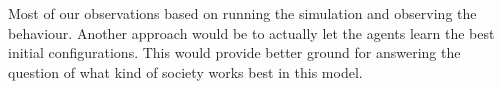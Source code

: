 \documentclass{JASSS}
\begin{document}
Most of our observations based on running the simulation and observing the behaviour. Another approach would be to actually let the agents learn the best initial configurations. This would provide better ground for answering the question of what kind of society works best in this model. 










\endparano




\end{document}
